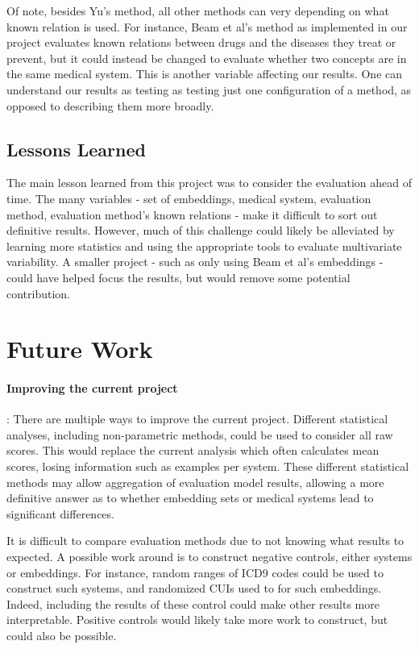 \documentclass[10pt]{article}
\begin{document}
Of note, besides Yu's method, all other methods can very depending on what known relation is used. For instance, Beam et al's method as implemented in our project evaluates known relations between drugs and the diseases they treat or prevent, but it could instead be changed to evaluate whether two concepts are in the same medical system. This is another variable affecting our results. One can understand our results as testing as testing just one configuration of a method, as opposed to describing them more broadly.

\subsection{Lessons Learned}
The main lesson learned from this project was to consider the evaluation ahead of time. The many variables - set of embeddings, medical system, evaluation method, evaluation method's known relations - make it difficult to sort out definitive results. However, much of this challenge could likely be alleviated by learning more statistics and using the appropriate tools to evaluate multivariate variability. A smaller project - such as only using Beam et al's embeddings - could have helped focus the results, but would remove some potential contribution. 

\section{Future Work}
\paragraph{Improving the current project}: There are multiple ways to improve the current project. Different statistical analyses, including non-parametric methods, could be used to consider all raw scores. This would replace the current analysis which often calculates mean scores, losing information such as examples per system. These different statistical methods may allow aggregation of evaluation model results, allowing a more definitive answer as to whether embedding sets or medical systems lead to significant differences.  

It is difficult to compare evaluation methods due to not knowing what results to expected. A possible work around is to construct negative controls, either systems or embeddings. For instance, random ranges of ICD9 codes could be used to construct such systems, and randomized CUIs used to for such embeddings. Indeed, including the results of these control could make other results more interpretable. Positive controls would likely take more work to construct, but could also be possible. 
\end{document}

